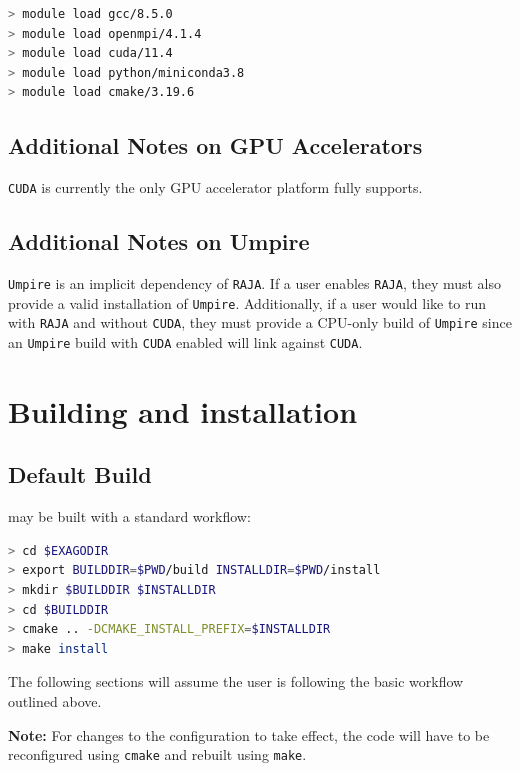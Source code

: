 \begin{lstlisting}[language=bash]
> module load gcc/8.5.0
> module load openmpi/4.1.4
> module load cuda/11.4
> module load python/miniconda3.8
> module load cmake/3.19.6
\end{lstlisting}

\subsection{Additional Notes on GPU Accelerators}

\texttt{CUDA} is currently the only GPU accelerator platform \exago fully supports.

\subsection{Additional Notes on Umpire}

\texttt{Umpire} is an implicit dependency of \texttt{RAJA}.
If a user enables \texttt{RAJA}, they must also provide a valid installation of \texttt{Umpire}.
Additionally, if a user would like to run \exago with \texttt{RAJA} and without \texttt{CUDA}, they must provide a CPU-only build of \texttt{Umpire} since an \texttt{Umpire} build with \texttt{CUDA} enabled will link against \texttt{CUDA}.

\section{Building and installation}
\label{sec:building_and_installation}

\subsection{Default Build}

\exago may be built with a standard \cmake workflow:

\begin{lstlisting}[language=bash,caption={Example \cmake workflow}]
> cd $EXAGODIR
> export BUILDDIR=$PWD/build INSTALLDIR=$PWD/install
> mkdir $BUILDDIR $INSTALLDIR
> cd $BUILDDIR
> cmake .. -DCMAKE_INSTALL_PREFIX=$INSTALLDIR
> make install
\end{lstlisting}

\noindent
The following sections will assume the user is following the basic workflow outlined above.

\textbf{Note:} For changes to the \cmake configuration to take effect, the code will have to be reconfigured using \texttt{cmake} and rebuilt using \texttt{make}.

